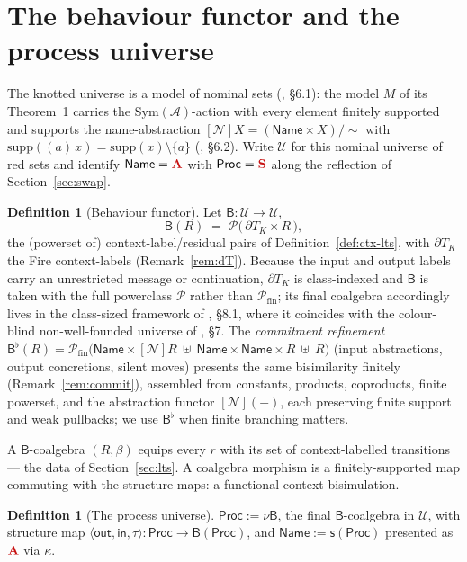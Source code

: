 \documentclass[11pt]{article}
\newcommand{\rd}[1]{\textcolor{redcopy}{#1}}
\newcommand{\RS}{\rd{\mathbf{S}}}              %
\newcommand{\RA}{\rd{\mathbf{A}}}              %
\newcommand{\swp}{\mathsf{s}}                  %
\newcommand{\kt}{\kappa}                       %
\newcommand{\abs}[2]{(#1)\,#2}                  %
\newcommand{\nset}[1]{[\mathcal{N}]#1}
\newcommand{\Proc}{\mathsf{Proc}}
\newcommand{\Name}{\mathsf{Name}}
\newcommand{\Pfin}{\mathcal{P}_{\mathrm{fin}}}
\newcommand{\B}{\mathsf{B}}
\newcommand{\Sym}{\mathrm{Sym}}
\newcommand{\supp}{\mathrm{supp}}
\newcommand{\DK}{\partial T_{K}}               %
\theoremstyle{plain}
\theoremstyle{definition}
\newtheorem{definition}[theorem]{Definition}
\begin{document}
\section{The behaviour functor and the process universe}\label{sec:functor}

The knotted universe is a model of nominal sets (\cite{knot}, \S6.1): the model
$M$ of its Theorem~1 carries the $\Sym(\mathcal A)$-action with every element
finitely supported and supports the name-abstraction
$\nset X=(\Name\times X)/{\sim}$ with $\supp(\abs a x)=\supp(x)\setminus\{a\}$
(\cite{knot}, \S6.2). Write $\mathcal U$ for this nominal universe of red sets and
identify $\Name=\RA$ with $\Proc=\RS$ along the reflection of
Section~\ref{sec:swap}.

\begin{definition}[Behaviour functor]\label{def:functor}
Let $\B\colon\mathcal U\to\mathcal U$,
\[
  \B(R) \;=\; \mathcal P\!\big(\,\DK\times R\,\big),
\]
the (powerset of) context-label/residual pairs of Definition~\ref{def:ctx-lts},
with $\DK$ the Fire context-labels (Remark~\ref{rem:dT}). Because the input and
output labels carry an unrestricted message or continuation, $\DK$ is
class-indexed and $\B$ is taken with the full powerclass $\mathcal P$ rather than
$\Pfin$; its final coalgebra accordingly lives in the class-sized framework of
\cite{knot}, \S8.1, where it coincides with the colour-blind non-well-founded
universe of \cite{knot}, \S7. The \emph{commitment refinement} $\B^{\flat}(R)=
\Pfin\big(\Name\times\nset R\ \uplus\ \Name\times\Name\times R\ \uplus\ R\big)$
(input abstractions, output concretions, silent moves) presents the same
bisimilarity finitely (Remark~\ref{rem:commit}), assembled from constants,
products, coproducts, finite powerset, and the abstraction functor $\nset{(-)}$,
each preserving finite support and weak pullbacks; we use $\B^{\flat}$ when finite
branching matters.
\end{definition}

A $\B$-coalgebra $(R,\beta)$ equips every $r$ with its set of context-labelled
transitions --- the data of Section~\ref{sec:lts}. A coalgebra morphism is a
finitely-supported map commuting with the structure maps: a functional context
bisimulation.

\begin{definition}[The process universe]\label{def:proc}
$\Proc:=\nu\B$, the final $\B$-coalgebra in $\mathcal U$, with structure map
$\langle\mathsf{out},\mathsf{in},\tau\rangle\colon\Proc\to\B(\Proc)$, and
$\Name:=\swp(\Proc)$ presented as $\RA$ via $\kt$.
\end{definition}
\end{document}
